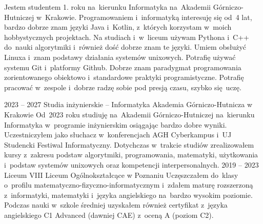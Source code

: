 \documentclass[8pt]{developercv} %
\begin{document}
\begin{minipage}[t]{0.5\textwidth} %
  \vspace{-\baselineskip} %
  Jestem studentem 1. roku na~kierunku Informatyka na~Akademii Górniczo-Hutniczej w~Krakowie.
  Programowaniem i~informatyką interesuję się od~4 lat, bardzo dobrze znam języki
  Java i~Kotlin, z~których korzystam w~moich hobbystycznych projektach.
  Na studiach i~w~liceum używam Pythona i~C++ do~nauki algorytmiki
  i~również dość dobrze znam te języki.
  Umiem obsłużyć Linuxa i~znam podstawy działania systemów unixowych.
  Potrafię używać systemu Git i~platformy Github.
  Dobrze znam paradygmat programowania zorientowanego obiektowo i~standardowe praktyki programistyczne.
  Potrafię pracować w~zespole i~dobrze radzę sobie pod presją czasu, szybko się~uczę.

\end{minipage}
\hfill %
\begin{minipage}[t]{0.45\textwidth} %
	\vspace{-\baselineskip}
	\begin{barchart}{5.5}
	\end{barchart}
\end{minipage}





\begin{entrylist}
  \entry
    {2023 -- 2027}
    {Studia inżynierskie -- Informatyka}
    {Akademia Górniczo-Hutnicza w Krakowie}
    {
      Od~2023 roku studiuję na~Akademii Górniczo-Hutniczej na~kierunku Informatyka w~programie inżynierskim osiągając bardzo dobre wyniki.
      Uczestniczyłem jako słuchacz w~konferencjach AGH Cyberkampus i~UJ Studencki Festiwal Informatyczny.
      Dotychczas w~trakcie studiów zrealizowałem kursy z~zakresu podstaw algorytmiki, programowania, matematyki, użytkowania i~podstaw systemów unixowych oraz kompetencji interpersonalnych.
    }
  \entry
    {2019 -- 2023}
    {Liceum}
    {VIII Liceum Ogólnokształcące w Poznaniu}
    {
      Uczęszczałem do~klasy o~profilu matematyczno-fizyczno-informatycznym i~zdałem maturę rozszerzoną z~informatyki, matematyki i~języka angielskiego na~bardzo wysokim poziomie.
      Podczas nauki w~szkole średniej uzyskałem również certyfikat z~języka angielskiego C1 Advanced (dawniej CAE) z~oceną A (poziom C2).
    }
\end{entrylist}
\end{document}
